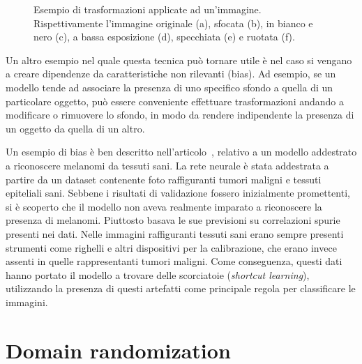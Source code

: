 \documentclass[12pt]{report}
\begin{document}
\begin{figure}[t]
	\hspace{0.01\textwidth}
	\caption{Esempio di trasformazioni applicate ad un'immagine. Rispettivamente l'immagine originale (a), sfocata (b), in bianco e nero (c), a bassa esposizione (d), specchiata (e) e ruotata (f).}
	\label{fig:immagine-augmentata}
\end{figure}

Un altro esempio nel quale questa tecnica può tornare utile è nel caso si vengano a creare dipendenze da caratteristiche non rilevanti (bias). Ad esempio, se un modello tende ad associare la presenza di uno specifico sfondo a quella di un particolare oggetto, può essere conveniente effettuare trasformazioni andando a modificare o rimuovere lo sfondo, in modo da rendere indipendente la presenza di un oggetto da quella di un altro.

Un esempio di bias è ben descritto nell'articolo~\cite{diagnostics12010040}, relativo a un modello addestrato a riconoscere melanomi da tessuti sani. La rete neurale è stata addestrata a partire da un dataset contenente foto raffiguranti tumori maligni e tessuti epiteliali sani. Sebbene i risultati di validazione fossero inizialmente promettenti, si è scoperto che il modello non aveva realmente imparato a riconoscere la presenza di melanomi. Piuttosto basava le sue previsioni su correlazioni spurie presenti nei dati. Nelle immagini raffiguranti tessuti sani erano sempre presenti strumenti come righelli e altri dispositivi per la calibrazione, che erano invece assenti in quelle rappresentanti tumori maligni. Come conseguenza, questi dati hanno portato il modello a trovare delle scorciatoie (\textit{shortcut learning}), utilizzando la presenza di questi artefatti come principale regola per classificare le immagini.

\section{Domain randomization}
\label{sec:randomization}
\end{document}
